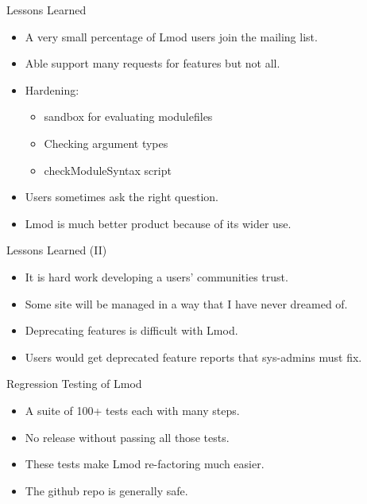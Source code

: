 \documentclass[dvipsnames,aspectratio=169]{beamer}
\begin{document}
\begin{frame}{Lessons Learned}
  \begin{itemize}
    \item A very small percentage of Lmod users join the mailing list.
    \item Able support many requests for features but not all.
    \item Hardening:
      \begin{itemize}
        \item sandbox for evaluating modulefiles
        \item Checking argument types
        \item checkModuleSyntax script
      \end{itemize}
    \item Users sometimes ask the right question.
    \item Lmod is much better product because of its wider use.
  \end{itemize}
\end{frame}

\begin{frame}{Lessons Learned (II)}
  \begin{itemize}
    \item It is hard work developing a users' communities trust.
    \item Some site will be managed in a way that I have never dreamed of.
    \item Deprecating features is difficult with Lmod.
    \item Users would get deprecated feature reports that sys-admins
      must fix.
  \end{itemize}
\end{frame}


\begin{frame}{Regression Testing of Lmod}
  \begin{itemize}
    \item A suite of 100+ tests each with many steps.
    \item No release without passing all those tests.
    \item These tests make Lmod re-factoring much easier.
    \item The github repo is generally safe.
  \end{itemize}
\end{frame}
\end{document}
